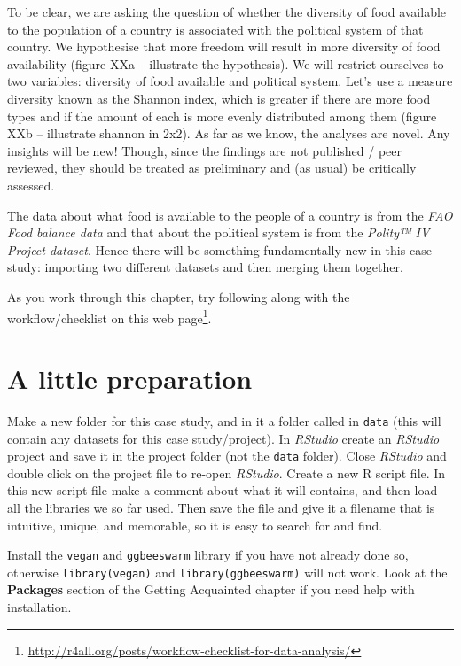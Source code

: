 \documentclass[]{book}
\makeatletter
\renewcommand{\href}[2]{#2\footnote{\url{#1}}}
\newenvironment{kframe}{%
\medskip{}
\setlength{\fboxsep}{.8em}
 \def\at@end@of@kframe{}%
 \ifinner\ifhmode%
  \def\at@end@of@kframe{\end{minipage}}%
  \begin{minipage}{\columnwidth}%
 \fi\fi%
 \def\FrameCommand##1{\hskip\@totalleftmargin \hskip-\fboxsep
 \colorbox{shadecolor}{##1}\hskip-\fboxsep
     \hskip-\linewidth \hskip-\@totalleftmargin \hskip\columnwidth}%
 \MakeFramed {\advance\hsize-\width
   \@totalleftmargin\z@ \linewidth\hsize
   \@setminipage}}%
 {\par\unskip\endMakeFramed%
 \at@end@of@kframe}
\newenvironment{rmdblock}[1]
  {
  \begin{itemize}
  \renewcommand{\labelitemi}{
    \raisebox{-.7\height}[0pt][0pt]{
      {\setkeys{Gin}{width=3em,keepaspectratio}\texttt{[image: images/\#1]}}
    }
  }
  \setlength{\fboxsep}{1em}
  \begin{kframe}
  \item
  }
  {
  \end{kframe}
  \end{itemize}
  }
\newenvironment{action}
  {\begin{rmdblock}{action}}
  {\end{rmdblock}}
\makeatother
\begin{document}
To be clear, we are asking the question of whether the diversity of food available to the population of a country is associated with the political system of that country. We hypothesise that more freedom will result in more diversity of food availability (figure XXa -- illustrate the hypothesis). We will restrict ourselves to two variables: diversity of food available and political system. Let's use a measure diversity known as the Shannon index, which is greater if there are more food types and if the amount of each is more evenly distributed among them (figure XXb -- illustrate shannon in 2x2). As far as we know, the analyses are novel. Any insights will be new! Though, since the findings are not published / peer reviewed, they should be treated as preliminary and (as usual) be critically assessed.

The data about what food is available to the people of a country is from the \emph{FAO Food balance data} and that about the political system is from the \emph{Polity™ IV Project dataset}. Hence there will be something fundamentally new in this case study: importing two different datasets and then merging them together.

As you work through this chapter, try following along with the \href{http://r4all.org/posts/workflow-checklist-for-data-analysis/}{workflow/checklist on this web page}.

\hypertarget{a-little-preparation}{%
\section{A little preparation}\label{a-little-preparation}}

Make a new folder for this case study, and in it a folder called in \texttt{data} (this will contain any datasets for this case study/project). In \emph{RStudio} create an \emph{RStudio} project and save it in the project folder (not the \texttt{data} folder). Close \emph{RStudio} and double click on the project file to re-open \emph{RStudio}. Create a new R script file. In this new script file make a comment about what it will contains, and then load all the libraries we so far used. Then save the file and give it a filename that is intuitive, unique, and memorable, so it is easy to search for and find.

\begin{action}
Install the \texttt{vegan} and \texttt{ggbeeswarm} library if you have
not already done so, otherwise \texttt{library(vegan)} and
\texttt{library(ggbeeswarm)} will not work. Look at the
\textbf{Packages} section of the Getting Acquainted chapter if you need
help with installation.
\end{action}
\end{document}
